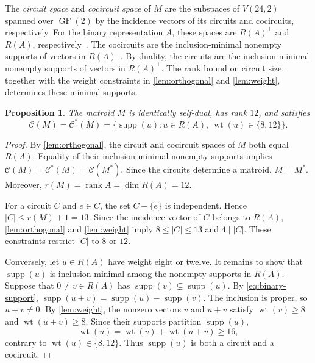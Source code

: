 \documentclass[11pt]{article}
\numberwithin{equation}{section}
\newtheorem{proposition}[proposition]{Proposition}
\DeclareMathOperator{\GF}{GF}
\DeclareMathOperator{\supp}{supp}
\DeclareMathOperator{\wt}{wt}
\begin{document}
The \emph{circuit space} and \emph{cocircuit space} of $M$ are the subspaces
of $V(24,2)$ spanned over $\GF(2)$ by the
incidence vectors of its circuits and cocircuits, respectively.
For the binary representation $A$, these spaces are $R(A)^\perp$ and
$R(A)$, respectively~\cite[Proposition~9.2.2]{Oxley2011}.
The cocircuits are the inclusion-minimal nonempty supports of vectors in
$R(A)$~\cite[Proposition~9.2.4]{Oxley2011}. By duality, the circuits are
the inclusion-minimal nonempty supports of vectors in $R(A)^\perp$.
The rank bound on circuit size, together with the weight constraints in
\autoref{lem:orthogonal} and \autoref{lem:weight}, determines these minimal supports.

\begin{proposition}\label{prop:circuits}
The matroid $M$ is identically self-dual, has rank $12$, and satisfies
\[
 \mathcal C(M)=\mathcal C^*(M)
 =\{\supp(u):u\in R(A),\ \wt(u)\in\{8,12\}\}.
\]
\end{proposition}

\begin{proof}
By \autoref{lem:orthogonal}, the circuit and cocircuit spaces of $M$
both equal $R(A)$. Equality of their inclusion-minimal nonempty supports
implies $\mathcal C(M)=\mathcal C^*(M)=\mathcal C(M^*)$.
Since the circuits determine a matroid, $M=M^*$.
Moreover, $r(M)=\operatorname{rank}A=\dim R(A)=12$.

For a circuit $C$ and $e\in C$, the set $C-\{e\}$ is independent.
Hence $|C|\leq r(M)+1=13$.
Since the incidence vector of $C$ belongs to $R(A)$,
\autoref{lem:orthogonal} and \autoref{lem:weight} imply
$8\leq|C|\leq13$ and $4\mid|C|$. These constraints restrict $|C|$ to $8$ or $12$.

Conversely, let $u\in R(A)$ have weight eight or twelve.
It remains to show that $\supp(u)$ is inclusion-minimal among the nonempty
supports in $R(A)$. Suppose that $0\ne v\in R(A)$ has
$\supp(v)\subsetneq\supp(u)$.
By \eqref{eq:binary-support},
$\supp(u+v)=\supp(u)-\supp(v)$.
The inclusion is proper, so $u+v\ne0$.
By \autoref{lem:weight}, the nonzero vectors $v$ and $u+v$ satisfy
$\wt(v)\geq8$ and $\wt(u+v)\geq8$. Since their supports partition
$\supp(u)$,
\[
 \wt(u)=\wt(v)+\wt(u+v)\geq16,
\]
contrary to $\wt(u)\in\{8,12\}$. Thus $\supp(u)$ is both a circuit and
a cocircuit.
\end{proof}
\end{document}
